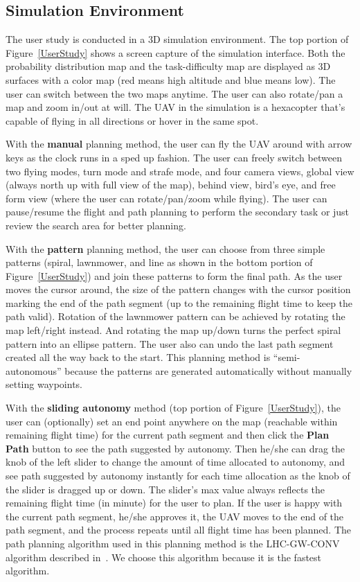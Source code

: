 \documentclass[journal]{IEEEtran}
\begin{document}
\subsection{Simulation Environment}

The user study is conducted in a 3D simulation environment. The top portion of Figure~\ref{UserStudy} shows a screen capture of the simulation interface. Both the probability distribution map and the task-difficulty map are displayed as 3D surfaces with a color map (red means high altitude and blue means low). The user can switch between the two maps anytime. The user can also rotate/pan a map and zoom in/out at will. The UAV in the simulation is a hexacopter that's capable of flying in all directions or hover in the same spot.

With the \textbf{manual} planning method, the user can fly the UAV around with arrow keys as the clock runs in a sped up fashion. The user can freely switch between two flying modes, turn mode and strafe mode, and four camera views, global view (always north up with full view of the map), behind view, bird's eye, and free form view (where the user can rotate/pan/zoom while flying). The user can pause/resume the flight and path planning to perform the secondary task or just review the search area for better planning.

With the \textbf{pattern} planning method, the user can choose from three simple patterns (spiral, lawnmower, and line as shown in the bottom portion of Figure~\ref{UserStudy}) and join these patterns to form the final path. As the user moves the cursor around, the size of the pattern changes with the cursor position marking the end of the path segment (up to the remaining flight time to keep the path valid). Rotation of the lawnmower pattern can be achieved by rotating the map left/right instead. And rotating the map up/down turns the perfect spiral pattern into an ellipse pattern. The user also can undo the last path segment created all the way back to the start. This planning method is ``semi-autonomous'' because the patterns are generated automatically without manually setting waypoints.

With the \textbf{sliding autonomy} method (top portion of Figure~\ref{UserStudy}), the user can (optionally) set an end point anywhere on the map (reachable within remaining flight time) for the current path segment and then click the \textbf{Plan Path} button to see the path suggested by autonomy. Then he/she can drag the knob of the left slider to change the amount of time allocated to autonomy, and see path suggested by autonomy instantly for each time allocation as the knob of the slider is dragged up or down. The slider's max value always reflects the remaining flight time (in minute) for the user to plan. If the user is happy with the current path segment, he/she approves it, the UAV moves to the end of the path segment, and the process repeats until all flight time has been planned. The path planning algorithm used in this planning method is the LHC-GW-CONV algorithm described in~\cite{Lin2009UAV, Lin2014Hierarchical}. We choose this algorithm because it is the fastest algorithm.
\end{document}
